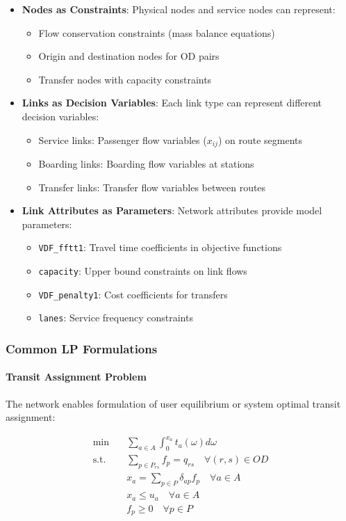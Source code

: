 \documentclass[11pt,a4paper]{article}
\begin{document}
\begin{itemize}
    \item \textbf{Nodes as Constraints}: Physical nodes and service nodes can represent:
    \begin{itemize}
        \item Flow conservation constraints (mass balance equations)
        \item Origin and destination nodes for OD pairs
        \item Transfer nodes with capacity constraints
    \end{itemize}
    \item \textbf{Links as Decision Variables}: Each link type can represent different decision variables:
    \begin{itemize}
        \item Service links: Passenger flow variables ($x_{ij}$) on route segments
        \item Boarding links: Boarding flow variables at stations
        \item Transfer links: Transfer flow variables between routes
    \end{itemize}
    \item \textbf{Link Attributes as Parameters}: Network attributes provide model parameters:
    \begin{itemize}
        \item \texttt{VDF\_fftt1}: Travel time coefficients in objective functions
        \item \texttt{capacity}: Upper bound constraints on link flows
        \item \texttt{VDF\_penalty1}: Cost coefficients for transfers
        \item \texttt{lanes}: Service frequency constraints
    \end{itemize}
\end{itemize}

\subsubsection{Common LP Formulations}

\paragraph{Transit Assignment Problem}
The network enables formulation of user equilibrium or system optimal transit assignment:

\begin{align}
\min \quad & \sum_{a \in A} \int_0^{x_a} t_a(\omega) d\omega \\
\text{s.t.} \quad & \sum_{p \in P_{rs}} f_p = q_{rs} \quad \forall (r,s) \in OD \\
& x_a = \sum_{p \in P} \delta_{ap} f_p \quad \forall a \in A \\
& x_a \leq u_a \quad \forall a \in A \\
& f_p \geq 0 \quad \forall p \in P
\end{align}
\end{document}
